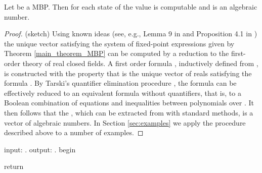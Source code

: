 \begin{theorem}\label{computability_of_MBP}
Let  be a MBP. Then for each state  of  the value  is computable and is an algebraic number.\end{theorem}
\begin{proof} (sketch)
Using known ideas (see, e.g., Lemma 9 in \cite{AM04} and Proposition 4.1 in \cite{MioSimpsonFICS2013}) the unique vector  satisfying the system of fixed-point expressions  given by Theorem \ref{main_theorem_MBP} can be computed by a reduction to the first-order theory of real closed fields. 
A first order formula , inductively defined from , is constructed with the property that  is the unique vector of reals satisfying the formula . By Tarski's quantifier elimination procedure \cite{Tarski1951}, the formula  can be effectively reduced to an equivalent formula  without quantifiers, that is, to a Boolean combination of equations and inequalities between polynomials over . It then follows that the  , which can be extracted from  with standard methods, is a vector of algebraic numbers.  In Section \ref{sec:examples} we apply the procedure described above to a number of examples.
\end{proof}

\begin{algorithm}[caption={computing the vector of values of a MBP.}, label={alg1}]
 input: . 
 output: . 
 begin
   
   
   
 return  
\end{algorithm}

\begin{comment}
The unique vector  satisfying the system of fixed-point expression given by Theorem \ref{main_theorem_MBP} can be computed by application of Tarski's celebrated quantifier elimination algorithm. This type of reduction have been already used (see, e.g.,  Lemma 9 in \cite{AM04} and Proposition 4.1 in \cite{MioSimpsonFICS2013}) for computing the solutions of other kinds of systems of fixed-point expressions (-calculi) over . For space reasons, here we only sketch the main ideas. Vectors  are represented by -tuples  of first-order real variables, with the constraint . The predicate  of point-wise order on vectors is definable by the formula . The graph\footnote{This is the -ary relation  defined as }  of the function  is directly definable by a formula  in the first-order theory of real closed fields. Lastly, fixed-point operators are definable in first-order logic by the general, and not specific to our present setting, scheme .  As a result, it is possible to translate the expression of Theorem \ref{main_theorem_MBP} to a first-order formula  such that unique vector  satisfying  is . By applying Tarski's  quantifier elimination procedure, the formula  can be rewritten into an equivalent formula without quantifiers. This is a system of polynomial inequalities and equations over , hence the solutions are algebraic numbers. \end{comment}

\begin{comment}
Since the fields or reals and algebraic numbers are elementary equivalent by standard methods,  is necessarily a vector of algebraic numbers. The following result then follows.
\end{comment}



